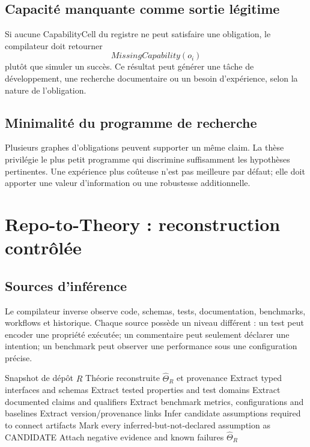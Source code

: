 \section{Capacité manquante comme sortie légitime}

Si aucune CapabilityCell du registre ne peut satisfaire une obligation, le compilateur doit retourner
\[
MissingCapability(o_i)
\]
plutôt que simuler un succès. Ce résultat peut générer une tâche de développement, une recherche documentaire ou un besoin d'expérience, selon la nature de l'obligation.

\section{Minimalité du programme de recherche}

Plusieurs graphes d'obligations peuvent supporter un même claim. La thèse privilégie le plus petit programme qui discrimine suffisamment les hypothèses pertinentes. Une expérience plus coûteuse n'est pas meilleure par défaut; elle doit apporter une valeur d'information ou une robustesse additionnelle.

\chapter{Repo-to-Theory : reconstruction contrôlée}

\section{Sources d'inférence}

Le compilateur inverse observe code, schemas, tests, documentation, benchmarks, workflows et historique. Chaque source possède un niveau différent : un test peut encoder une propriété exécutée; un commentaire peut seulement déclarer une intention; un benchmark peut observer une performance sous une configuration précise.

\begin{algorithm}
\caption{Reconstruction d'une théorie implicite candidate}
\begin{algorithmic}[1]
\Require Snapshot de dépôt $R$
\Ensure Théorie reconstruite $\widehat\Theta_R$ et provenance
\State Extract typed interfaces and schemas
\State Extract tested properties and test domains
\State Extract documented claims and qualifiers
\State Extract benchmark metrics, configurations and baselines
\State Extract version/provenance links
\State Infer candidate assumptions required to connect artifacts
\State Mark every inferred-but-not-declared assumption as CANDIDATE
\State Attach negative evidence and known failures
\State \Return $\widehat\Theta_R$
\end{algorithmic}
\end{algorithm}

